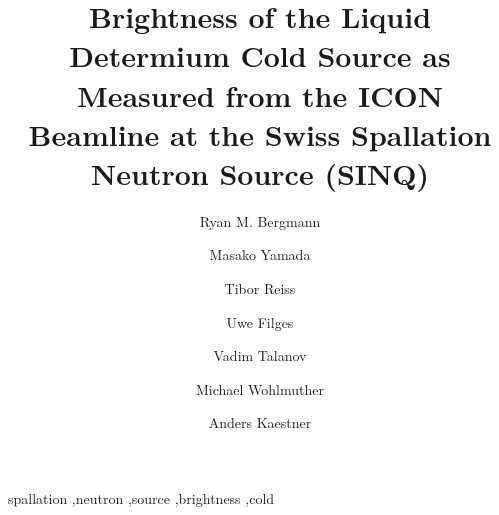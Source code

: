 \documentclass[5p,12pt]{elsarticle}
\begin{document}
\begin{frontmatter}



\title{Brightness of the Liquid Determium Cold Source as Measured from the ICON Beamline at the Swiss Spallation Neutron Source (SINQ)}


\author{Ryan M. Bergmann}

\author{Masako Yamada}

\author{Tibor Reiss}

\author{Uwe Filges}

\author{Vadim Talanov}

\author{Michael Wohlmuther}

\author{Anders Kaestner}


\address{Paul Scherrer Institut, Villigen, Switzerland}

\begin{abstract}


\end{abstract}

\begin{keyword}
spallation \sep neutron \sep source \sep brightness \sep cold


\end{keyword}


\end{frontmatter}
\end{document}

